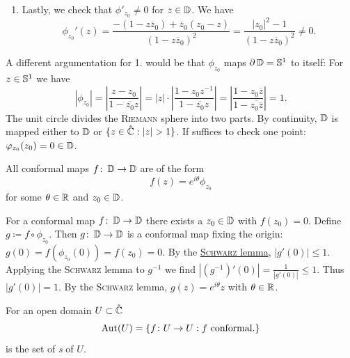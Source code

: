 \documentclass[a4paper,english]{article}
\begin{document}
\begin{pr}
\begin{enumerate}
        \item
        Lastly, we check that $\phi'_{z_0} \ne 0$ for $z \in \D$.
        We have
        \begin{equation*}
            \phi_{z_0}'(z)
            = \frac{- (1 - z \overline{z}_0) + \overline{z}_0 (z_0 - z)}{(1 - z \overline{z}_0)^2}
            = \frac{| z_0 |^2 - 1}{(1 - z \overline{z}_0)^2}
            \ne 0.
        \end{equation*}
    \end{enumerate}
\end{pr}

A different argumentation for 1. would be that $\phi_{z_0}$ maps $\partial \D = \S^1$ to itself:
For $z \in \S^1$ we have
\begin{equation*}
    | \phi_{z_0} |
    = \left|\frac{z - z_0}{1 - \overline{z_0} z}\right|
    = | z | \cdot \left|\frac{1 - z_0 z^{-1}}{1 - \overline{z_0} z}\right|
    = \left|\frac{1 - z_0 \overline{z}}{1 - \overline{z_0 \overline{z}}}\right|
    = 1.
\end{equation*}
The unit circle divides the \textsc{Riemann} sphere into two parts. By continuity, $\D$ is mapped either to $\D$ or $\{ z \in \hat{\CC}: | z | > 1 \}$.
If suffices to check one point: $\phi_{z_0}(z_0) = 0 \in \D$.

\begin{thm}{}{}
    All conformal maps $f \colon \D \to \D$ are of the form 
    \begin{equation*}
        f(z)
        = e^{i \theta} \phi_{z_0}
    \end{equation*}
    for some $\theta \in \R$ and $z_0 \in \D$.
\end{thm}

\begin{pr}
    For a conformal map $f \colon \D \to \D$ there exists a $z_0 \in \D$ with $f(z_0) = 0$.
    Define $g \coloneqq f \circ \phi_{z_0}$.
    Then $g \colon \D \to \D$ is a conformal map fixing the origin: $g(0) = f(\phi_{z_0}(0)) = f(z_0) = 0$.
    By the \hyperref[th:schwarz]{\textsc{Schwarz} lemma}, $| g'(0) | \le 1$.
    Applying the \textsc{Schwarz} lemma to $g^{-1}$ we find $| (g^{-1})'(0) | = \frac{1}{| g'(0) |} \le 1$.
    Thus $| g'(0) | = 1$.
    By the \textsc{Schwarz} lemma, $g(z) = e^{i \theta} z$ with $\theta \in \R$.
\end{pr}

\begin{defn}
    For an open domain $U \subset \hat{\CC}$
    \begin{equation*}
        \Aut(U)
        = \{ f \colon U \to U: f \text{ conformal.} \}
    \end{equation*}
    is the set of \emph{s} of $U$.
\end{defn}
\end{document}
